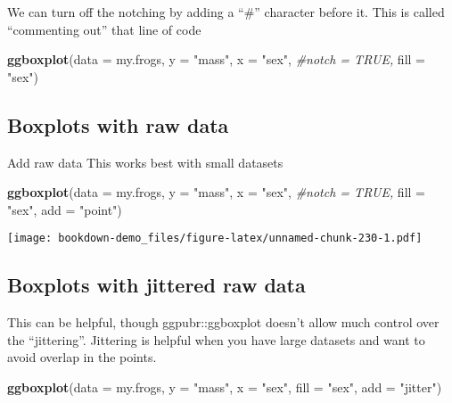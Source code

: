 \documentclass[]{book}
\newenvironment{Shaded}{\begin{snugshade}}{\end{snugshade}}
\newcommand{\KeywordTok}[1]{\textcolor[rgb]{0.13,0.29,0.53}{\textbf{#1}}}
\newcommand{\DataTypeTok}[1]{\textcolor[rgb]{0.13,0.29,0.53}{#1}}
\newcommand{\StringTok}[1]{\textcolor[rgb]{0.31,0.60,0.02}{#1}}
\newcommand{\CommentTok}[1]{\textcolor[rgb]{0.56,0.35,0.01}{\textit{#1}}}
\newcommand{\NormalTok}[1]{#1}
\theoremstyle{definition}
\theoremstyle{definition}
\theoremstyle{definition}
\theoremstyle{remark}
\begin{document}
We can turn off the notching by adding a ``\#'' character before it.
This is called ``commenting out'' that line of code

\begin{Shaded}
\begin{Highlighting}[]
\KeywordTok{ggboxplot}\NormalTok{(}\DataTypeTok{data =}\NormalTok{ my.frogs,}
          \DataTypeTok{y =} \StringTok{"mass"}\NormalTok{,}
          \DataTypeTok{x =} \StringTok{"sex"}\NormalTok{,}
          \CommentTok{#notch  = TRUE,}
          \DataTypeTok{fill =} \StringTok{"sex"}\NormalTok{)}
\end{Highlighting}
\end{Shaded}

\subsection{Boxplots with raw data}\label{boxplots-with-raw-data}

Add raw data This works best with small datasets

\begin{Shaded}
\begin{Highlighting}[]
\KeywordTok{ggboxplot}\NormalTok{(}\DataTypeTok{data =}\NormalTok{ my.frogs,}
          \DataTypeTok{y =} \StringTok{"mass"}\NormalTok{,}
          \DataTypeTok{x =} \StringTok{"sex"}\NormalTok{,}
          \CommentTok{#notch  = TRUE,}
          \DataTypeTok{fill =} \StringTok{"sex"}\NormalTok{,}
          \DataTypeTok{add =} \StringTok{"point"}\NormalTok{)}
\end{Highlighting}
\end{Shaded}

\texttt{[image: bookdown-demo\_files/figure-latex/unnamed-chunk-230-1.pdf]}

\subsection{Boxplots with jittered raw
data}\label{boxplots-with-jittered-raw-data}

This can be helpful, though ggpubr::ggboxplot doesn't allow much control
over the ``jittering''. Jittering is helpful when you have large
datasets and want to avoid overlap in the points.

\begin{Shaded}
\begin{Highlighting}[]
\KeywordTok{ggboxplot}\NormalTok{(}\DataTypeTok{data =}\NormalTok{ my.frogs,}
          \DataTypeTok{y =} \StringTok{"mass"}\NormalTok{,}
          \DataTypeTok{x =} \StringTok{"sex"}\NormalTok{,}
          \DataTypeTok{fill =} \StringTok{"sex"}\NormalTok{,}
          \DataTypeTok{add =} \StringTok{"jitter"}\NormalTok{)}
\end{Highlighting}
\end{Shaded}
\end{document}
